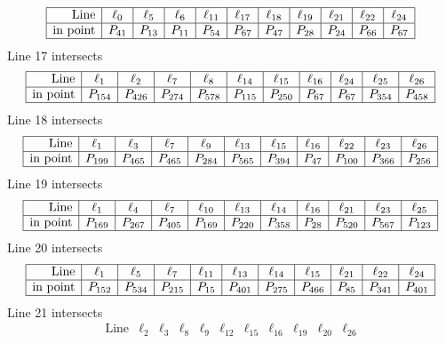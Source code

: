 \documentclass{article}
\begin{document}
{$$\begin{array}{|r*{10}{|c}|}
\hline
\mbox{Line}  & \ell_{0} & \ell_{5} & \ell_{6} & \ell_{11} & \ell_{17} & \ell_{18} & \ell_{19} & \ell_{21} & \ell_{22} & \ell_{24}\\
\hline
\mbox{in point}  & P_{41} & P_{13} & P_{11} & P_{54} & P_{67} & P_{47} & P_{28} & P_{24} & P_{66} & P_{67}\\
\hline
\end{array}
$$
Line 17 intersects 
$$
\begin{array}{|r*{10}{|c}|}
\hline
\mbox{Line}  & \ell_{1} & \ell_{2} & \ell_{7} & \ell_{8} & \ell_{14} & \ell_{15} & \ell_{16} & \ell_{24} & \ell_{25} & \ell_{26}\\
\hline
\mbox{in point}  & P_{154} & P_{426} & P_{274} & P_{578} & P_{115} & P_{250} & P_{67} & P_{67} & P_{354} & P_{458}\\
\hline
\end{array}
$$
Line 18 intersects 
$$
\begin{array}{|r*{10}{|c}|}
\hline
\mbox{Line}  & \ell_{1} & \ell_{3} & \ell_{7} & \ell_{9} & \ell_{13} & \ell_{15} & \ell_{16} & \ell_{22} & \ell_{23} & \ell_{26}\\
\hline
\mbox{in point}  & P_{199} & P_{465} & P_{465} & P_{284} & P_{565} & P_{394} & P_{47} & P_{100} & P_{366} & P_{256}\\
\hline
\end{array}
$$
Line 19 intersects 
$$
\begin{array}{|r*{10}{|c}|}
\hline
\mbox{Line}  & \ell_{1} & \ell_{4} & \ell_{7} & \ell_{10} & \ell_{13} & \ell_{14} & \ell_{16} & \ell_{21} & \ell_{23} & \ell_{25}\\
\hline
\mbox{in point}  & P_{169} & P_{267} & P_{405} & P_{169} & P_{220} & P_{358} & P_{28} & P_{520} & P_{567} & P_{123}\\
\hline
\end{array}
$$
Line 20 intersects 
$$
\begin{array}{|r*{10}{|c}|}
\hline
\mbox{Line}  & \ell_{1} & \ell_{5} & \ell_{7} & \ell_{11} & \ell_{13} & \ell_{14} & \ell_{15} & \ell_{21} & \ell_{22} & \ell_{24}\\
\hline
\mbox{in point}  & P_{152} & P_{534} & P_{215} & P_{15} & P_{401} & P_{275} & P_{466} & P_{85} & P_{341} & P_{401}\\
\hline
\end{array}
$$
Line 21 intersects 
$$
\begin{array}{|r*{10}{|c}|}
\hline
\mbox{Line}  & \ell_{2} & \ell_{3} & \ell_{8} & \ell_{9} & \ell_{12} & \ell_{15} & \ell_{16} & \ell_{19} & \ell_{20} & \ell_{26}\\

\end{array}$$}
\end{document}
